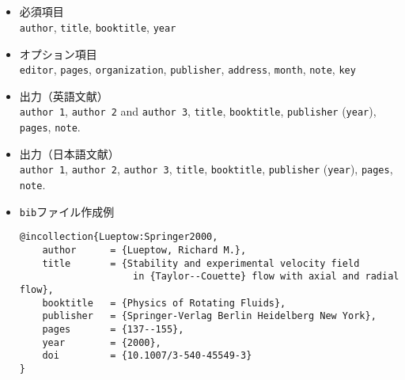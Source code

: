 \documentclass[a4paper,fleqn,uplatex,dvipdfmx]{jsarticle}
\begin{document}
\subsection{\ttincollection}
\label{ssec:incollection}
\begin{screen}
    \begin{itemize}
        \item 必須項目 \\
        \verb|author|, \verb|title|, \verb|booktitle|, \verb|year|
        \item オプション項目 \\
        \verb|editor|, \verb|pages|, \verb|organization|, \verb|publisher|, \verb|address|, \verb|month|, \verb|note|, \verb|key|
        \item 出力（英語文献） \\
            \colorbox[gray]{0.8}{\texttt{author 1}}, \colorbox[gray]{0.8}{\texttt{author 2}} and \colorbox[gray]{0.8}{\texttt{author 3}}, \colorbox[gray]{0.8}{\texttt{title}}, \colorbox[gray]{0.8}{\texttt{booktitle}}, \colorbox[gray]{0.8}{\texttt{publisher}} (\colorbox[gray]{0.8}{\texttt{year}}), \colorbox[gray]{0.8}{\texttt{pages}}, \colorbox[gray]{0.8}{\texttt{note}}.
        \item 出力（日本語文献） \\
            \colorbox[gray]{0.8}{\texttt{author 1}}, \colorbox[gray]{0.8}{\texttt{author 2}}, \colorbox[gray]{0.8}{\texttt{author 3}}, \colorbox[gray]{0.8}{\texttt{title}}, \colorbox[gray]{0.8}{\texttt{booktitle}}, \colorbox[gray]{0.8}{\texttt{publisher}} (\colorbox[gray]{0.8}{\texttt{year}}), \colorbox[gray]{0.8}{\texttt{pages}}, \colorbox[gray]{0.8}{\texttt{note}}.
        \item \verb|bib|ファイル作成例 \vspace{-3mm}
\begin{verbatim}
@incollection{Lueptow:Springer2000,
    author      = {Lueptow, Richard M.},
    title       = {Stability and experimental velocity field 
                    in {Taylor--Couette} flow with axial and radial flow},
    booktitle   = {Physics of Rotating Fluids},
    publisher   = {Springer-Verlag Berlin Heidelberg New York},
    pages       = {137--155},
    year        = {2000},
    doi         = {10.1007/3-540-45549-3}
}
\end{verbatim}
    \end{itemize}
\end{screen}
\end{document}

